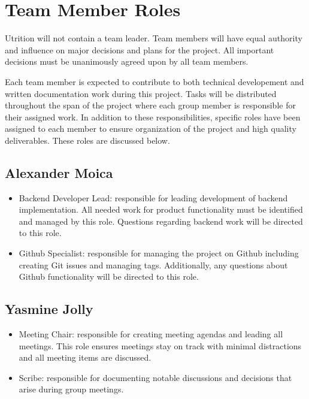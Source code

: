 \documentclass{article}
\begin{document}
\section{Team Member Roles}

Utrition will not contain a team leader. Team members will have equal authority and influence on major decisions and plans for the project. All important decisions must be unanimously agreed upon by all team members.

Each team member is expected to contribute to both technical developement and written documentation work during this project. Tasks will be distributed throughout the span of the project where each group member is responsible for their assigned work. In addition to these responsibilities, specific roles have been assigned to each member to ensure organization of the project and high quality deliverables. These roles are discussed below. 

\subsection{Alexander Moica}

\begin{itemize}
	\item Backend Developer Lead: responsible for leading development of backend implementation. All needed work for product functionality must be identified and managed by this role. Questions regarding backend work will be directed to this role.
	\item Github Specialist: responsible for managing the project on Github including creating Git issues and managing tags. Additionally, any questions about Github functionality will be directed to this role.
\end{itemize}

\subsection{Yasmine Jolly}

\begin{itemize}
	\item Meeting Chair: responsible for creating meeting agendas and leading all meetings. This role ensures meetings stay on track with minimal distractions and all meeting items are discussed. 
	\item Scribe: responsible for documenting notable discussions and decisions that arise during group meetings.
\end{itemize}
\end{document}
